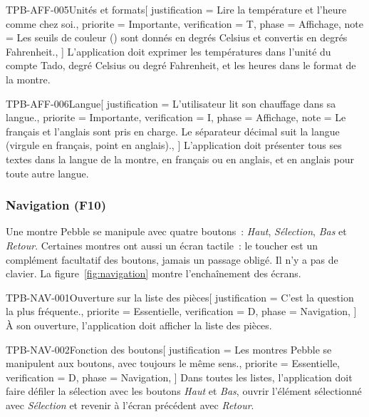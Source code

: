 \begin{exigence}{TPB-AFF-005}{Unités et formats}[
    justification = {Lire la température et l'heure comme chez soi.},
    priorite      = {Importante},
    verification  = {T},
    phase         = {Affichage},
    note          = {Les seuils de couleur () sont donnés en degrés
                     Celsius et convertis en degrés Fahrenheit.},
  ]
  L'application doit exprimer les températures dans l'unité du compte Tado, degré Celsius
  ou degré Fahrenheit, et les heures dans le format de la montre.
\end{exigence}

\begin{exigence}{TPB-AFF-006}{Langue}[
    justification = {L'utilisateur lit son chauffage dans sa langue.},
    priorite      = {Importante},
    verification  = {I},
    phase         = {Affichage},
    note          = {Le français et l'anglais sont pris en charge. Le séparateur décimal
                     suit la langue (virgule en français, point en anglais).},
  ]
  L'application doit présenter tous ses textes dans la langue de la montre, en français ou
  en anglais, et en anglais pour toute autre langue.
\end{exigence}

\subsubsection{Navigation (F10)}
\label{sec:navigation}

Une montre Pebble se manipule avec quatre boutons~: \emph{Haut}, \emph{Sélection},
\emph{Bas} et \emph{Retour}. Certaines montres ont aussi un écran tactile~: le toucher
est un complément facultatif des boutons, jamais un passage obligé. Il n'y a pas de clavier.
La figure~\ref{fig:navigation} montre l'enchaînement des écrans.

\begin{exigence}{TPB-NAV-001}{Ouverture sur la liste des pièces}[
    justification = {C'est la question la plus fréquente.},
    priorite      = {Essentielle},
    verification  = {D},
    phase         = {Navigation},
  ]
  À son ouverture, l'application doit afficher la liste des pièces.
\end{exigence}

\begin{exigence}{TPB-NAV-002}{Fonction des boutons}[
    justification = {Les montres Pebble se manipulent aux boutons, avec toujours le même
                     sens.},
    priorite      = {Essentielle},
    verification  = {D},
    phase         = {Navigation},
  ]
  Dans toutes les listes, l'application doit faire défiler la sélection avec les boutons
  \emph{Haut} et \emph{Bas}, ouvrir l'élément sélectionné avec \emph{Sélection} et revenir à
  l'écran précédent avec \emph{Retour}.
\end{exigence}

